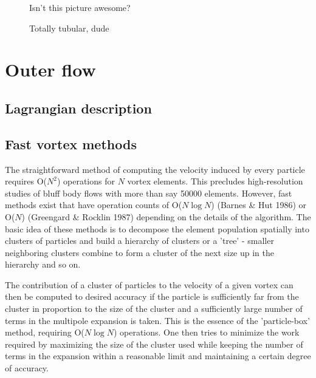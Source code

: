 
\lipsum[81-100]

\begin{figure}
  \centering
  
  \caption[Awesome picture]{Isn't this picture awesome?}
\end{figure}

\begin{figure}
  \centering
  
  \caption[Tubular picture]{Totally tubular, dude}
\end{figure}


\section{Outer flow}

\subsection{Lagrangian description}

\subsection{Fast vortex methods}
The straightforward method of computing the velocity induced by every particle requires O($N^2$) operations for $N$ vortex elements.
This precludes high-resolution studies of bluff body flows with more than say 50000 elements.
However, fast methods exist that have operation counts of O($N\log N$)  (Barnes \& Hut 1986) or O($N$) (Greengard \& Rocklin 1987) depending on the details of the algorithm.
The basic idea of these methods is to decompose the element population spatially into clusters of particles and build a hierarchy of clusters or a 'tree' - smaller neighboring clusters combine to form a cluster of the next size up in the hierarchy and so on.

The contribution of a cluster of particles to the velocity of a given vortex can then be computed to desired accuracy if the particle is sufficiently far from the cluster in proportion to the size of the cluster and a sufficiently large number of terms in the multipole expansion is taken.
This is the essence of the 'particle-box' method, requiring O($N\log N$) operations.
One then tries to minimize the work required by maximizing the size of the cluster used while keeping the number of terms in the expansion within a reasonable limit and maintaining a certain degree of accuracy.

